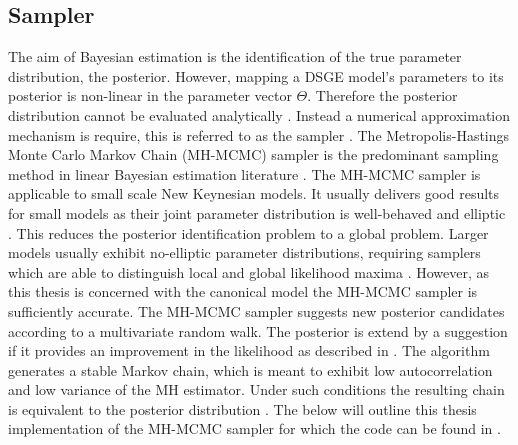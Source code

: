 \documentclass[12pt,a4paper,english]{article} %
\begin{document}
		
	\subsection{Sampler}
	The aim of Bayesian estimation is the identification of the true parameter distribution, the posterior. However, mapping a DSGE model's parameters to its posterior is non-linear in the parameter vector $\Theta$. Therefore the posterior distribution cannot be evaluated analytically \cite{herbst_bayesian_2016}. Instead a numerical approximation mechanism is require, this is referred to as the sampler \cite{guerron-quintana_bayesian_2013}. The Metropolis-Hastings Monte Carlo Markov Chain (MH-MCMC) sampler is the predominant sampling method in linear Bayesian estimation literature \cite{guerron-quintana_bayesian_2013}. The MH-MCMC sampler is applicable to small scale New Keynesian models. It usually delivers good results for small models as their joint parameter distribution is well-behaved and elliptic \cite{herbst_bayesian_2016}. This reduces the posterior identification problem to a global problem. Larger models usually exhibit no-elliptic parameter distributions, requiring samplers which are able to distinguish local and global likelihood maxima \cite{herbst_bayesian_2016}. However, as this thesis is concerned with the canonical model the MH-MCMC sampler is sufficiently accurate.	
	The MH-MCMC sampler suggests new posterior candidates according to a multivariate random walk. The posterior is extend by a suggestion if it provides an improvement in the likelihood as described in . The algorithm generates a stable Markov chain, which is meant to exhibit low autocorrelation and low variance of the MH estimator. Under such conditions the resulting chain is equivalent to the posterior distribution \cite{herbst_bayesian_2016}. The below will outline this thesis implementation of the MH-MCMC sampler for which the code can be found in . \\
\end{document}
